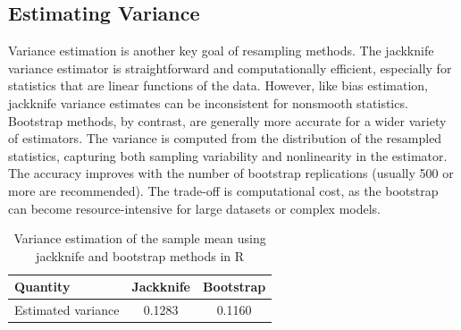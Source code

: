 \documentclass{article}
\begin{document}
\newpage


\subsection{Estimating Variance}

Variance estimation is another key goal of resampling methods. The jackknife variance estimator is straightforward and computationally efficient, especially for statistics that are linear functions of the data. However, like bias estimation, jackknife variance estimates can be inconsistent for nonsmooth statistics.\\

Bootstrap methods, by contrast, are generally more accurate for a wider variety of estimators. The variance is computed from the distribution of the resampled statistics, capturing both sampling variability and nonlinearity in the estimator. The accuracy improves with the number of bootstrap replications (usually 500 or more are recommended). The trade-off is computational cost, as the bootstrap can become resource-intensive for large datasets or complex models.\\

\begin{table}[h!]
\centering
\caption{Variance estimation of the sample mean using jackknife and bootstrap methods in R}
\begin{tabular}{|l|c|c|}
\hline
\textbf{Quantity} & \textbf{Jackknife} & \textbf{Bootstrap} \\
\hline
Estimated variance & 0.1283 & 0.1160 \\
\hline
\end{tabular}
\label{tab:variance-comparison}
\end{table}
\end{document}
